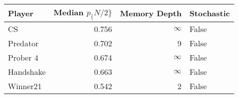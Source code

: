 \begin{tabular}{lrrl}
\toprule
    Player &  Median $p_\{N/2\}$ &  Memory Depth & Stochastic \\
\midrule
        CS &             0.756 &            \(\infty\) &      False \\
  Predator &             0.702 &             9 &      False \\
  Prober 4 &             0.674 &            \(\infty\) &      False \\
 Handshake &             0.663 &            \(\infty\) &      False \\
  Winner21 &             0.542 &             2 &      False \\
\bottomrule
\end{tabular}
